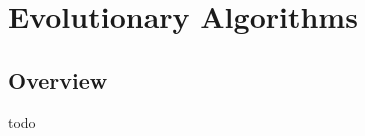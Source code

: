 


\chapter{Evolutionary Algorithms}
\label{ch:evolutionary}

\section{Overview}
todo

\newpage
\newpage
\newpage
\newpage
\newpage
\newpage
\newpage
\newpage
\newpage
\newpage

